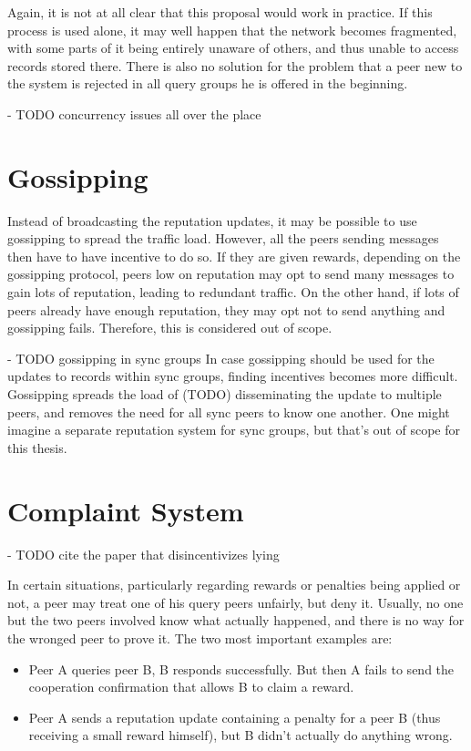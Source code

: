 Again, it is not at all clear that this proposal would work in practice. If this
process is used alone, it may well happen that the network becomes fragmented,
with some parts of it being entirely unaware of others, and thus unable to
access records stored there. There is also no solution for the problem that a
peer new to the system is rejected in all query groups he is offered in the
beginning.

- TODO concurrency issues all over the place

\section{Gossipping}
Instead of broadcasting the reputation updates, it may be possible to use
gossipping to spread the traffic load. However, all the peers sending messages
then have to have incentive to do so. If they are given rewards, depending on
the gossipping protocol, peers low on reputation may opt to send many messages
to gain lots of reputation, leading to redundant traffic. On the other hand, if
lots of peers already have enough reputation, they may opt not to send anything
and gossipping fails. Therefore, this is considered out of scope.

- TODO gossipping in sync groups
In case gossipping should be used for the updates to records within sync groups,
finding incentives becomes more difficult. Gossipping spreads the load of (TODO)    
disseminating the update to multiple peers, and removes the need for all sync
peers to know one another. One might imagine a separate reputation system for
sync groups, but that's out of scope for this thesis.


\section{Complaint System}
\label{sec:desc_complaints}
- TODO cite the paper that disincentivizes lying

In certain situations, particularly regarding rewards or penalties being applied
or not, a peer may treat one of his query peers unfairly, but deny it. Usually,
no one but the two peers involved know what actually happened, and there is no
way for the wronged peer to prove it. The two most important examples are:
\begin{itemize}
\item Peer A queries peer B, B responds successfully. But then A fails to send
      the cooperation confirmation that allows B to claim a reward.
\item Peer A sends a reputation update containing a penalty for a peer B (thus
      receiving a small reward himself), but B didn't actually do anything
      wrong.
\end{itemize}

